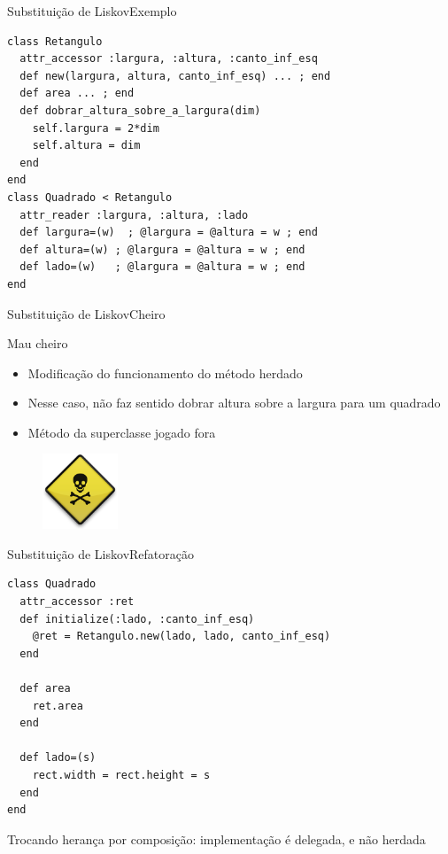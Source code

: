 \documentclass[10pt]{beamer}
\begin{document}
\begin{frame}[fragile]{Substituição de Liskov}{Exemplo}

\begin{lstlisting}
class Retangulo
  attr_accessor :largura, :altura, :canto_inf_esq
  def new(largura, altura, canto_inf_esq) ... ; end
  def area ... ; end
  def dobrar_altura_sobre_a_largura(dim)
    self.largura = 2*dim
    self.altura = dim
  end
end
class Quadrado < Retangulo
  attr_reader :largura, :altura, :lado
  def largura=(w)  ; @largura = @altura = w ; end
  def altura=(w) ; @largura = @altura = w ; end
  def lado=(w)   ; @largura = @altura = w ; end
end
\end{lstlisting}

\end{frame}
\begin{frame}{Substituição de Liskov}{Cheiro}
  \begin{block}{Mau cheiro}
    \begin{itemize}
      \item Modificação do funcionamento do método herdado
      \item Nesse caso, não faz sentido dobrar altura sobre a largura para um quadrado
      \item Método da superclasse jogado fora
    \end{itemize}
  \end{block}

  \begin{figure}
    \includegraphics[width=0.2\textwidth]{images/toxicSign.png}
  \end{figure}

\end{frame}


\begin{frame}[fragile]{Substituição de Liskov}{Refatoração}
\begin{lstlisting}
class Quadrado
  attr_accessor :ret
  def initialize(:lado, :canto_inf_esq)
    @ret = Retangulo.new(lado, lado, canto_inf_esq)
  end
  
  def area
    ret.area
  end
  
  def lado=(s)
    rect.width = rect.height = s
  end
end
\end{lstlisting}
\pause
Trocando herança por composição: implementação é delegada, e não herdada
\end{frame}
\end{document}
